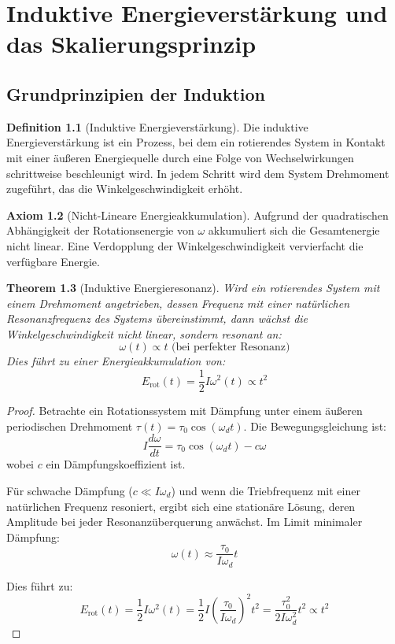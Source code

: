 \documentclass[12pt,a4paper]{report}
\theoremstyle{plain}
\newtheorem{theorem}{Theorem}[section]
\theoremstyle{definition}
\newtheorem{definition}[theorem]{Definition}
\newtheorem{axiom}[theorem]{Axiom}
\theoremstyle{remark}
\begin{document}
\chapter{Induktive Energieverstärkung und das Skalierungsprinzip}

\section{Grundprinzipien der Induktion}

\begin{definition}[Induktive Energieverstärkung]
	Die induktive Energieverstärkung ist ein Prozess, bei dem ein rotierendes System in Kontakt mit einer äußeren Energiequelle durch eine Folge von Wechselwirkungen schrittweise beschleunigt wird. In jedem Schritt wird dem System Drehmoment zugeführt, das die Winkelgeschwindigkeit erhöht.
\end{definition}

\begin{axiom}[Nicht-Lineare Energieakkumulation]
	\label{ax:nichtlinear}
	Aufgrund der quadratischen Abhängigkeit der Rotationsenergie von $\omega$ akkumuliert sich die Gesamtenergie nicht linear. Eine Verdopplung der Winkelgeschwindigkeit vervierfacht die verfügbare Energie.
\end{axiom}

\begin{theorem}[Induktive Energieresonanz]
	\label{thm:resonanz}
	Wird ein rotierendes System mit einem Drehmoment angetrieben, dessen Frequenz mit einer natürlichen Resonanzfrequenz des Systems übereinstimmt, dann wächst die Winkelgeschwindigkeit nicht linear, sondern resonant an:
	\[
	\omega(t) \propto t \text{ (bei perfekter Resonanz)}
	\]
	Dies führt zu einer Energieakkumulation von:
	\[
	E_{\text{rot}}(t) = \frac{1}{2} I \omega^2(t) \propto t^2
	\]
\end{theorem}

\begin{proof}
	Betrachte ein Rotationssystem mit Dämpfung unter einem äußeren periodischen Drehmoment $\tau(t) = \tau_0 \cos(\omega_d t)$. Die Bewegungsgleichung ist:
	\[
	I \frac{d\omega}{dt} = \tau_0 \cos(\omega_d t) - c \omega
	\]
	wobei $c$ ein Dämpfungskoeffizient ist.
	
	Für schwache Dämpfung ($c \ll I \omega_d$) und wenn die Triebfrequenz mit einer natürlichen Frequenz resoniert, ergibt sich eine stationäre Lösung, deren Amplitude bei jeder Resonanzüberquerung anwächst. Im Limit minimaler Dämpfung:
	\[
	\omega(t) \approx \frac{\tau_0}{I \omega_d} t
	\]
	
	Dies führt zu:
	\[
	E_{\text{rot}}(t) = \frac{1}{2} I \omega^2(t) = \frac{1}{2} I \left(\frac{\tau_0}{I \omega_d}\right)^2 t^2 = \frac{\tau_0^2}{2 I \omega_d^2} t^2 \propto t^2
	\]
\end{proof}
\end{document}
